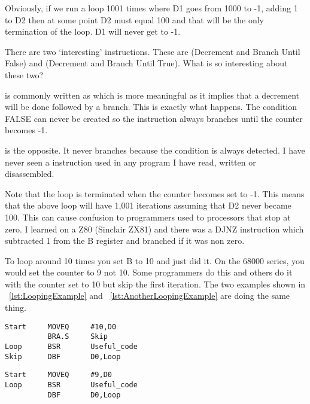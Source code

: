 Obviously, if we run a loop 1001 times where D1 goes from 1000 to
    -{}1, adding 1 to D2 then at some point D2 must equal 100 and that will be
    the only termination of the loop. D1 will never get to -{}1.

There are two `interesting'  instructions. These are 
    (Decrement and Branch Until False) and  (Decrement and Branch Until
    True). What is so interesting about these two?

 is commonly written as  which is more meaningful as it
    implies that a decrement will be done followed by a branch. This is
    exactly what happens. The condition FALSE can never be created so the
    instruction always branches until the counter becomes -{}1.

 is the opposite. It never branches because the condition is
    always detected. I have never seen a  instruction used in any program I
    have read, written or disassembled.

Note that the loop is terminated when the counter becomes set to -{}1.
    This means that the above loop will have 1,001 iterations assuming that D2
    never became 100. This can cause confusion to programmers used to
    processors that stop at zero. I learned on a Z80 (Sinclair ZX81) and there
    was a DJNZ instruction which subtracted 1 from the B register and branched
    if it was non zero.

To loop around 10 times you set B to 10 and just did it. On the
    68000 series, you would set the counter to 9 not 10. Some programmers do
    this and others do it with the counter set to 10 but skip the first
    iteration. The two examples shown in \lstlistingname~\ref{lst:LoopingExample} and \lstlistingname~\ref{lst:AnotherLoopingExample} are doing the same thing.

\begin{lstlisting}[firstnumber=1,caption={Looping Example},label={lst:LoopingExample}]
Start     MOVEQ     #10,D0
          BRA.S     Skip
Loop      BSR       Useful_code
Skip      DBF       D0,Loop
\end{lstlisting}

\begin{lstlisting}[firstnumber=1,caption={Another Looping Example},label={lst:AnotherLoopingExample}]
Start     MOVEQ     #9,D0
Loop      BSR       Useful_code
          DBF       D0,Loop
\end{lstlisting}

